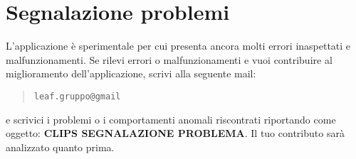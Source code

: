 \documentclass[../ClipsManualeUtente.tex]{subfiles}
\begin{document}
\section{Segnalazione problemi}
	L'applicazione è sperimentale per cui presenta ancora molti errori inaspettati e malfunzionamenti. Se rilevi errori o malfunzionamenti e vuoi contribuire al miglioramento dell'applicazione, scrivi alla seguente mail:
	\begin{quote}
		\centering
		\verb|leaf.gruppo@gmail|
	\end{quote}
	e scrivici i problemi o i comportamenti anomali riscontrati riportando come oggetto: \textbf{CLIPS SEGNALAZIONE PROBLEMA}.
	Il tuo contributo sarà analizzato quanto prima.
\end{document}
